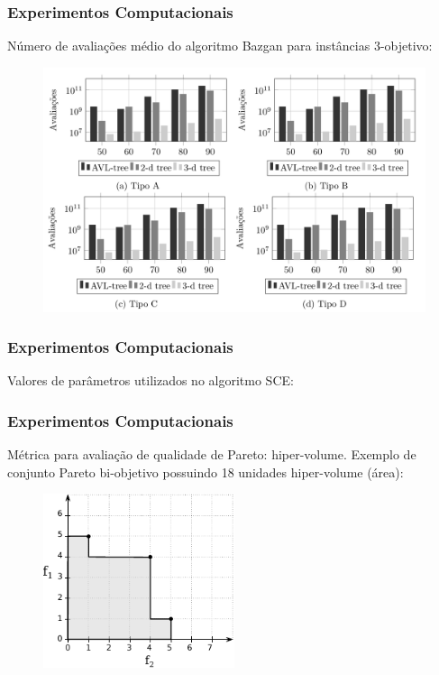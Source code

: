 \documentclass[10pt,xcolor=table,fleqn]{beamer}
\begin{document}
\begin{frame}
  \frametitle{Experimentos Computacionais}
  Número de avaliações médio do algoritmo Bazgan para instâncias $3$-objetivo:
  \begin{figure}[H]
    \includegraphics[scale=0.3]{../tab/cmp/3dim}
  \end{figure}
\end{frame}

\begin{frame}
  \frametitle{Experimentos Computacionais}
  Valores de parâmetros utilizados no algoritmo SCE:
  \begin{table}[H]
    \small
    \centering
    
  \end{table}
\end{frame}

\begin{frame}
  \frametitle{Experimentos Computacionais}
  Métrica para avaliação de qualidade de Pareto: hiper-volume.
  \vfill
  Exemplo de conjunto Pareto bi-objetivo possuindo 18 unidades hiper-volume (área):
  \begin{figure}
    \centering
    \includegraphics[width=0.5\textwidth]{../img/sce/hypervol2}
  \end{figure}
\end{frame}
\end{document}
